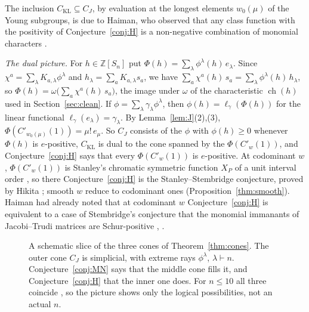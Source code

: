 \documentclass[11pt]{amsart}
\theoremstyle{definition}
\theoremstyle{remark}
\newcommand{\Z}{\mathbb{Z}}
\newcommand{\CKL}{C_{\mathrm{KL}}}
\newcommand{\CTNN}{C_{\mathrm{TNN}}}
\newcommand{\CJ}{C_{J}}
\newcommand{\Cp}[1]{C'_{#1}(1)}
\DeclareMathOperator{\ch}{ch}
\begin{document}
The inclusion $\CKL\subseteq\CJ$, by evaluation at the longest elements $w_0(\mu)$ of the Young subgroups, is due to Haiman, who observed that any class function with the positivity of Conjecture~\ref{conj:H} is a non-negative combination of monomial characters \cite[\S2 and Prop.~4.1(1)]{Hai}.

\emph{The dual picture.} For $h\in\Z[S_n]$ put $\Phi(h)=\sum_\lambda\phi^\lambda(h)\,e_\lambda$. Since $\chi^a=\sum_\lambda K_{a,\lambda}\phi^\lambda$ and $h_\lambda=\sum_aK_{a,\lambda}s_a$, we have $\sum_a\chi^a(h)\,s_a=\sum_\lambda\phi^\lambda(h)\,h_\lambda$, so $\Phi(h)=\omega\bigl(\sum_a\chi^a(h)\,s_a\bigr)$, the image under $\omega$ of the characteristic $\ch(h)$ used in Section~\ref{sec:clean}. If $\phi=\sum_\lambda\gamma_\lambda\phi^\lambda$, then $\phi(h)=\ell_\gamma(\Phi(h))$ for the linear functional $\ell_\gamma(e_\lambda)=\gamma_\lambda$. By Lemma~\ref{lem:J}(2),(3), $\Phi(\Cp{w_0(\mu)})=\mu!\,e_\mu$. So $\CJ$ consists of the $\phi$ with $\phi(h)\ge0$ whenever $\Phi(h)$ is $e$-positive, $\CKL$ is dual to the cone spanned by the $\Phi(\Cp w)$, and Conjecture~\ref{conj:H} says that every $\Phi(\Cp w)$ is $e$-positive. At codominant $w$, $\Phi(\Cp w)$ is Stanley's chromatic symmetric function $X_P$ of a unit interval order \cite[Cor.~7.2]{CHSS}, so there Conjecture~\ref{conj:H} is the Stanley--Stembridge conjecture, proved by Hikita \cite{Hik}; smooth $w$ reduce to codominant ones (Proposition~\ref{thm:smooth}). Haiman had already noted that at codominant $w$ Conjecture~\ref{conj:H} is equivalent to a case of Stembridge's conjecture that the monomial immanants of Jacobi--Trudi matrices are Schur-positive \cite[\S5]{Hai}, \cite{Ste92}.

\begin{figure}[ht]
\centering
{}
\caption{A schematic slice of the three cones of Theorem~\ref{thm:cones}. The outer cone $\CJ$ is simplicial, with extreme rays $\phi^\lambda$, $\lambda\vdash n$. Conjecture~\ref{conj:MN} says that the middle cone fills it, and Conjecture~\ref{conj:H} that the inner one does. For $n\le10$ all three coincide \cite{McN}, so the picture shows only the logical possibilities, not an actual $n$.}\label{fig:cones}
\end{figure}
\end{document}
